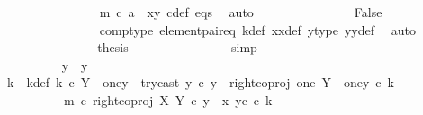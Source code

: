 \begin{isabellebody}
\ \ \ \ \ \ \ \ \ \ \ \ \ \ \isamarkupfalse%
\ {\isacartoucheopen}m\ {\isasymcirc}\isactrlsub c\ a\ {\isacharequal}{\kern0pt}\ {\isasymlangle}x{}{\isacharcomma}{\kern0pt}y{}{\isasymrangle}{\isacartoucheclose}\ c{\isacharunderscore}{\kern0pt}def\ eqs\ \isamarkupfalse%
\ auto\isanewline
\ \ \ \ \ \ \ \ \ \ \ \ \isamarkupfalse%
\ \isamarkupfalse%
\ False\isanewline
\ \ \ \ \ \ \ \ \ \ \ \ \ \ \isamarkupfalse%
\ comp{\isacharunderscore}{\kern0pt}type\ element{\isacharunderscore}{\kern0pt}pair{\isacharunderscore}{\kern0pt}eq\ k{\isacharunderscore}{\kern0pt}def\ x{}x{}{\isacharunderscore}{\kern0pt}def\ y{}{\isacharprime}{\kern0pt}{\isacharunderscore}{\kern0pt}type\ y{}y{}{\isacharunderscore}{\kern0pt}def{\isacharparenleft}{\kern0pt}{}{\isacharparenright}{\kern0pt}\ \isamarkupfalse%
\ auto\isanewline
\ \ \ \ \ \ \ \ \ \ \ \ \isamarkupfalse%
\ \isamarkupfalse%
\ {\isacharquery}{\kern0pt}thesis\isanewline
\ \ \ \ \ \ \ \ \ \ \ \ \ \ \isamarkupfalse%
\ simp\isanewline
\ \ \ \ \ \ \ \ \ \ \isamarkupfalse%
\isanewline
\ \ \ \ \ \ \ \ \isamarkupfalse%
\isanewline
\ \ \ \ \ \ \isamarkupfalse%
\isanewline
\ \ \ \ \ \ \ \ \isamarkupfalse%
\ {\isachardoublequoteopen}y\ {\isasymnoteq}\ y{}{\isachardoublequoteclose}\isanewline
\ \ \ \ \ \ \ \ \isamarkupfalse%
\ \isamarkupfalse%
\ k\ \ k{\isacharunderscore}{\kern0pt}def{\isacharcolon}{\kern0pt}\ {\isachardoublequoteopen}k\ {\isasymin}\isactrlsub c\ Y\ {\isasymsetminus}\ {\isacharparenleft}{\kern0pt}one{\isacharcomma}{\kern0pt}y{}{\isacharparenright}{\kern0pt}\ {\isasymand}\ try{\isacharunderscore}{\kern0pt}cast\ y{}\ {\isasymcirc}\isactrlsub c\ y\ {\isacharequal}{\kern0pt}\ right{\isacharunderscore}{\kern0pt}coproj\ one\ {\isacharparenleft}{\kern0pt}Y\ {\isasymsetminus}\ {\isacharparenleft}{\kern0pt}one{\isacharcomma}{\kern0pt}y{}{\isacharparenright}{\kern0pt}{\isacharparenright}{\kern0pt}\ {\isasymcirc}\isactrlsub c\ k\ {\isasymand}\ \isanewline
\ \ \ \ \ \ \ \ \ \ m\ {\isasymcirc}\isactrlsub c\ right{\isacharunderscore}{\kern0pt}coproj\ X\ Y\ {\isasymcirc}\isactrlsub c\ y\ {\isacharequal}{\kern0pt}\ {\isasymlangle}x{}{\isacharcomma}{\kern0pt}\ y{}\isactrlsup c\ {\isasymcirc}\isactrlsub c\ k{\isasymrangle}{\isachardoublequoteclose}\isanewline

\end{isabellebody}
